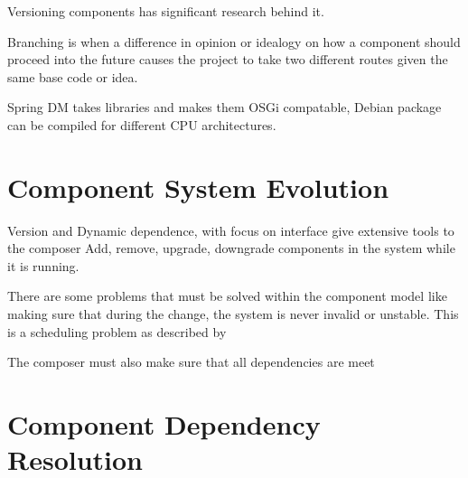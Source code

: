 Versioning components has significant research behind it.

Branching is when a difference in opinion or idealogy on how a component should proceed into the future
causes the project to take two different routes given the same base code or idea.

Spring DM takes libraries and makes them OSGi compatable, 
Debian package can be compiled for different CPU architectures.


\section{Component System Evolution}
Version and Dynamic dependence, with focus on interface give extensive tools to the composer 
Add, remove, upgrade, downgrade components in the system while it is running.

There are some problems that must be solved within the component model like making sure that during the change,
the system is never invalid or unstable. 
This is a scheduling problem as described by %

The composer must also make sure that all dependencies are meet

\section{Component Dependency Resolution}

